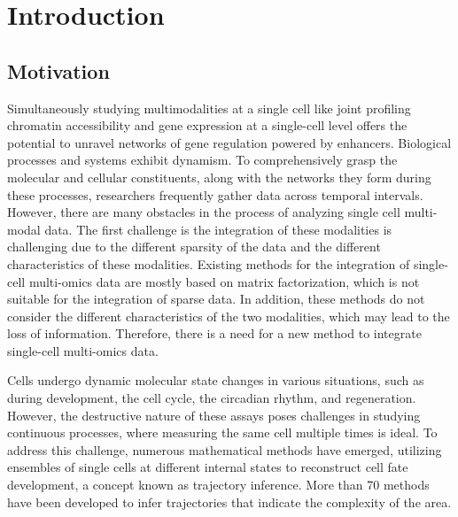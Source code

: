 \chapter{Introduction}
\label{chapter:introduction}

\graphicspath{{chapter1/figs/}}

\section{Motivation}
\label{introduction:sec1.motivation}

Simultaneously studying multimodalities at a single cell like joint profiling chromatin accessibility and gene expression at a single-cell level offers the potential to unravel networks of gene regulation powered by enhancers. Biological processes and systems exhibit dynamism. To comprehensively grasp the molecular and cellular constituents, along with the networks they form during these processes, researchers frequently gather data across temporal intervals. However, there are many obstacles in the process of analyzing single cell multi-modal data. The first challenge is the integration of these modalities is challenging due to the different sparsity of the data and the different characteristics of these modalities. Existing methods for the integration of single-cell multi-omics data are mostly based on matrix factorization, which is not suitable for the integration of sparse data. In addition, these methods do not consider the different characteristics of the two modalities, which may lead to the loss of information. Therefore, there is a need for a new method to integrate single-cell multi-omics data.

Cells undergo dynamic molecular state changes in various situations, such as during development, the cell cycle, the circadian rhythm, and regeneration. However, the destructive nature of these assays poses challenges in studying continuous processes, where measuring the same cell multiple times is ideal. To address this challenge, numerous mathematical methods have emerged, utilizing ensembles of single cells at different internal states to reconstruct cell fate development, a concept known as trajectory inference. More than 70 methods have been developed to infer trajectories that indicate the complexity of the area. 


